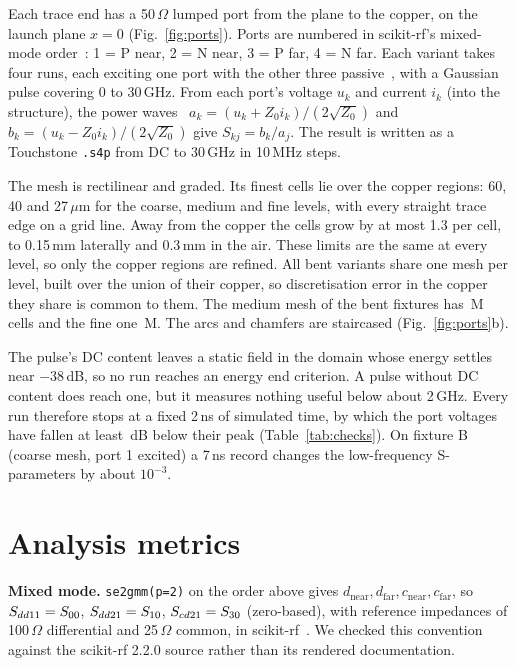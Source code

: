 Each trace end has a 50\,$\Omega$ lumped port from the plane to the copper, on the launch plane $x = 0$
(Fig.~\ref{fig:ports}). Ports are numbered in scikit-rf's mixed-mode order~\cite{skrf_se2gmm}: 1 = P near,
2 = N near, 3 = P far, 4 = N far. Each variant takes four runs, each exciting one port with the other three
passive~\cite{openems_ports}, with a Gaussian pulse covering 0 to 30\,GHz. From each port's voltage $u_k$ and
current $i_k$ (into the structure), the power waves~\cite{kurokawa1965}
$a_k = (u_k + Z_0 i_k)/(2\sqrt{Z_0})$ and $b_k = (u_k - Z_0 i_k)/(2\sqrt{Z_0})$ give $S_{kj} = b_k/a_j$. The
result is written as a Touchstone \texttt{.s4p} from DC to 30\,GHz in 10\,MHz steps.

The mesh is rectilinear and graded. Its finest cells lie over the copper regions: 60, 40 and 27\,$\mu$m for the
coarse, medium and fine levels, with every straight trace edge on a grid line. Away from the copper the cells grow
by at most 1.3 per cell, to 0.15\,mm laterally and 0.3\,mm in the air. These limits are the same at every level, so
only the copper regions are refined. All bent variants share one mesh per level, built over the union of
their copper, so discretisation error in the copper they share is common to them. The medium mesh of the bent
fixtures has \CellsMedium\,M cells and the fine one \CellsFine\,M. The arcs and chamfers are staircased
(Fig.~\ref{fig:ports}b).

The pulse's DC content leaves a static field in the domain whose energy settles near $-38$\,dB, so no run
reaches an energy end criterion. A pulse without DC content does reach one, but it measures nothing useful below
about 2\,GHz. Every run therefore stops at a fixed 2\,ns of simulated time, by which the port voltages have
fallen at least \TruncWorst\,dB below their peak (Table~\ref{tab:checks}). On fixture B (coarse mesh, port 1
excited) a 7\,ns record changes the low-frequency S-parameters by about $10^{-3}$.

\section{Analysis metrics}
\label{sec:metrics}

\textbf{Mixed mode.} \texttt{se2gmm(p=2)} on the order above gives $d_\mathrm{near}, d_\mathrm{far},
c_\mathrm{near}, c_\mathrm{far}$, so $S_{dd11}=S_{00}$, $S_{dd21}=S_{10}$, $S_{cd21}=S_{30}$ (zero-based), with
reference impedances of 100\,$\Omega$ differential and 25\,$\Omega$ common, in scikit-rf~\cite{arsenovic2022}. We
checked this convention against the scikit-rf 2.2.0 source rather than its rendered documentation.

